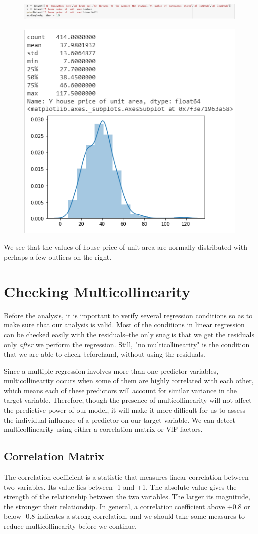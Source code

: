 \documentclass{article}
\begin{document}
\begin{figure}[H]\includegraphics[width=1.1\linewidth]{6}\end{figure}
\begin{figure}[H]\centering\includegraphics[width=0.5\linewidth]{7}\end{figure}
We see that the values of house price of unit area are normally distributed with perhaps a few outliers on the right.
\section*{Checking Multicollinearity}
Before the analysis, it is important to verify several regression conditions so as to make sure that our analysis is valid. Most of the conditions in linear regression can be checked easily with the residuals--the only snag is that we get the residuals only \textit{after} we perform the regression. Still, "no multicollinearity" is the condition that we are able to check beforehand, without using the residuals.

Since a multiple regression involves more than one predictor variables, multicollinearity occurs when some of them are highly correlated with each other, which means each of these predictors will account for similar variance in the target variable. Therefore, though the presence of multicollinearity will not affect the predictive power of our model, it will make it more difficult for us to assess the individual influence of a predictor on our target variable. We can detect multicollinearity using either a correlation matrix or VIF factors.
\subsection*{Correlation Matrix}
The correlation coefficient is a statistic that measures linear correlation between two variables. Its value lies between -1 and +1. The absolute value gives the strength of the relationship between the two variables. The larger its magnitude, the stronger their relationship. In general, a correlation coefficient above +0.8 or below -0.8 indicates a strong correlation, and we should take some measures to reduce multicollinearity before we continue.
\end{document}
